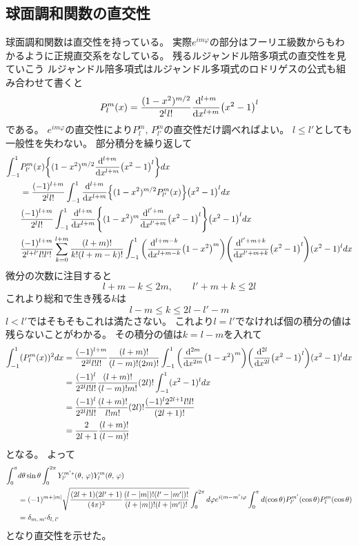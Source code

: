 \documentclass[../../master.tex]{subfiles}
\begin{document}
\subsection{球面調和関数の直交性}
球面調和関数は直交性を持っている。
実際\(e^{im\varphi}\)の部分はフーリエ級数からもわかるように正規直交系をなしている。
残るルジャンドル陪多項式の直交性を見ていこう
ルジャンドル陪多項式はルジャンドル多項式のロドリゲスの公式も組み合わせて書くと
\begin{equation}
	P_l^m(x) = \frac{(1-x^2)^{m/2}}{2^l l!}\dv[l+m]{x}\qty(x^2-1)^l
\end{equation}
である。
\(e^{im\varphi}\)の直交性により\(P_l^m,\,P_{l'}^m\)の直交性だけ調べればよい。
\(l\leq l'\)としても一般性を失わない。
部分積分を繰り返して
\begin{align}
	\int_{-1}^{1} &P_{l'}^{m}(x)\qty{(1-x^2)^{m/2}\dv[l+m]{x}\qty(x^2-1)^l} dx \notag\\
	&= \frac{(-1)^{l+m}}{2^l l!}\int_{-1}^{1} \dv[l+m]{x}\Bigl\{(1-x^2)^{m/2}P_{l'}^{m}(x)\Bigr\}\qty(x^2-1)^l dx\\
	&\frac{(-1)^{l+m}}{2^l l!}\int_{-1}^{1} \dv[l+m]{x}\qty{(1-x^2)^{m}\dv[l'+m]{x}(x^2-1)^l}\qty(x^2-1)^l dx\\
	&\frac{(-1)^{l+m}}{2^{l+l'} l!l'!}\sum_{k=0}^{l+m} \frac{(l+m)!}{k!(l+m-k)!}
	\int_{-1}^{1}\qty(\dv[l+m-k]{x}(1-x^2)^m)\qty(\dv[l'+m+k]{x}(x^2-1)^l)(x^2-1)^l dx
\end{align}
微分の次数に注目すると
\begin{equation}
	l+m-k \leq 2m,\qquad l'+m+k \leq 2l
\end{equation}
これより総和で生き残る\(k\)は
\begin{equation}
	l-m\leq k \leq 2l - l' -m
\end{equation}
\(l<l'\)ではそもそもこれは満たさない。
これより\(l=l'\)でなければ個の積分の値は残らないことがわかる。
その積分の値は\(k=l-m\)を入れて
\begin{align}
	\int_{-1}^{1} (P_l^m(x))^2 dx
	&=\frac{(-1)^{l+m}}{2^{2l}l!l!}\frac{(l+m)!}{(l-m)!(2m)!}
	\int_{-1}^{1}\qty(\dv[2m]{x}(1-x^2)^m)\qty(\dv[2l]{x}(x^2-1)^l)(x^2-1)^l dx\\
	&=\frac{(-1)^l}{2^{2l}l!l!}\frac{(l+m)!}{(l-m)!m!}(2l)!
	\int_{-1}^{1}(x^2-1)^l dx\\
	&=\frac{(-1)^l}{2^{2l}l!l!}\frac{(l+m)!}{l!m!}(2l)!\frac{(-1)^l2^{2l+1}l!l!}{(2l+1)!}\\
	&=\frac{2}{2l+1}\frac{(l+m)!}{(l-m)!}
\end{align}
となる。
よって
\begin{align}
	\int_{0}^{\pi} &d\theta \sin\theta \int_{0}^{2\pi} Y_{l'}^{m'*}(\theta,\,\varphi) Y_l^m(\theta,\,\varphi) \notag\\
	&= (-1)^{m+\abs{m}}\sqrt{\frac{(2l+1)(2l'+1)}{(4\pi)^2}\frac{(l-\abs{m})!(l'-\abs{m'})!}{(l+\abs{m})!(l+\abs{m'})!}}
	\int_{0}^{2\pi}d\varphi e^{i(m-m')\varphi} \int_{0}^{\pi} d(\cos\theta) P_{l'}^{m'}(\cos\theta)P_l^m(\cos\theta)\\
	&=\delta_{m,\,m'}\delta_{l,\,l'}
\end{align}
となり直交性を示せた。
\end{document}
